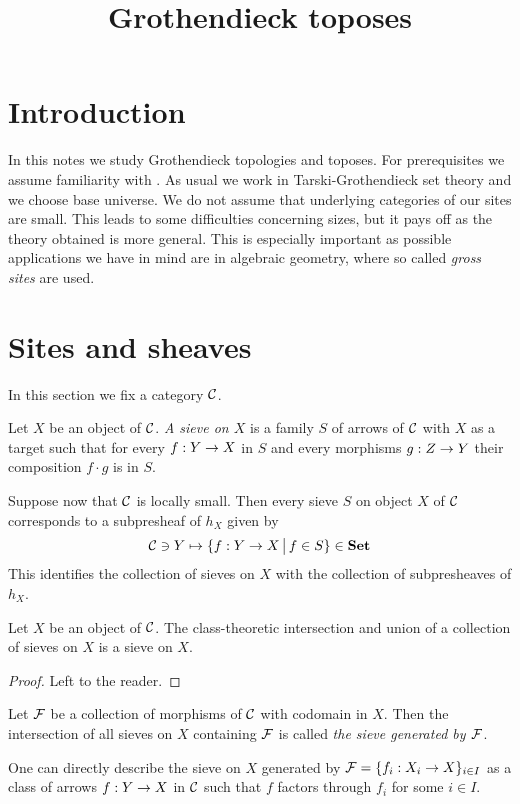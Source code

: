 



\title{Grothendieck toposes}
\date{}
\maketitle

\section{Introduction}
\noindent
In this notes we study Grothendieck topologies and toposes. For prerequisites we assume familiarity with \cite{Presheaves}. As usual we work in Tarski-Grothendieck set theory and we choose base universe. We do not assume that underlying categories of our sites are small. This leads to some difficulties concerning sizes, but it pays off as the theory obtained is more general. This is especially important as possible applications we have in mind are in algebraic geometry, where so called \textit{gross sites} are used. 

\section{Sites and sheaves}
\noindent
In this section we fix a category ${\mathcal C}$.

\begin{definition}
Let $X$ be an object of ${\mathcal C}$. \textit{A sieve on $X$} is a family $S$ of arrows of ${\mathcal C}$ with $X$ as a target such that for every $f:Y\rightarrow X$ in $S$ and every morphisms $g:Z\rightarrow Y$ their composition $f\cdot g$ is in $S$.
\end{definition}
\noindent
Suppose now that ${\mathcal C}$ is locally small. Then every sieve $S$ on object $X$ of ${\mathcal C}$ corresponds to a subpresheaf of $h_X$ given by
$${\mathcal C}\ni Y\mapsto \{f:Y\rightarrow X\,\big|\,f\in S\}\in \mathbf{Set}$$
This identifies the collection of sieves on $X$ with the collection of subpresheaves of $h_X$.

\begin{fact}\label{fact:propertiesofsieves}
Let $X$ be an object of ${\mathcal C}$. The class-theoretic intersection and union of a collection of sieves on $X$ is a sieve on $X$.
\end{fact}
\begin{proof}
Left to the reader.
\end{proof}

\begin{definition}
Let ${\mathcal F}$ be a collection of morphisms of ${\mathcal C}$ with codomain in $X$. Then the intersection of all sieves on $X$ containing ${\mathcal F}$ is called \textit{the sieve generated by ${\mathcal F}$}.
\end{definition}
\noindent
One can directly describe the sieve on $X$ generated by ${\mathcal F} = \{f_i:X_i\rightarrow X\}_{i\in I}$ as a class of arrows $f:Y\rightarrow X$ in ${\mathcal C}$ such that $f$ factors through $f_i$ for some $i\in I$. 

